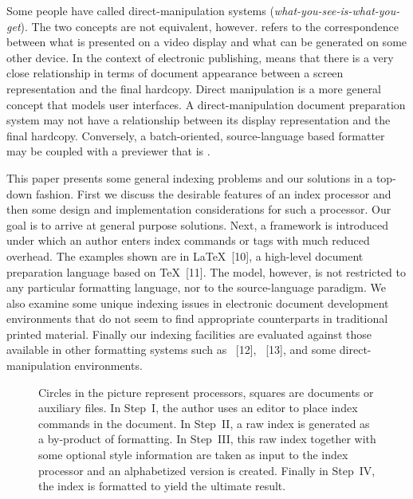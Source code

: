 Some people have called direct-manipulation systems {\W}
({\it what-you-see-is-what-you-get\/}).
The two concepts are not equivalent, however.
{\W} refers to the correspondence between what is presented on a video display
and what can be generated on some other device.  In the context of
electronic publishing, {\W} means that there is a very close relationship
in terms of document appearance
between a screen representation and the final hardcopy.
Direct manipulation is a more general concept that models user interfaces.
A direct-manipulation document preparation system may not have
a {\W} relationship between its display representation and the final hardcopy.
Conversely, a batch-oriented, source-language based formatter 
may be coupled with a previewer that is {\W}.

This paper presents some general indexing problems and our solutions 
in a top-down fashion.
First we discuss the desirable features of an index processor
and then some design and implementation considerations for such a processor.
Our goal is to arrive at general purpose solutions.
Next, a framework is introduced under which an author enters index commands
or tags with much reduced overhead.
The examples shown are in {\LaTeX}~[10], a high-level
document preparation language based on {\TeX}~[11].
The model, however, is not restricted to any particular formatting language,
nor to the source-language paradigm.
We also examine some unique indexing issues in
electronic document development environments that do not seem to find
appropriate counterparts in traditional printed material.
Finally our indexing facilities are evaluated against those available in
other formatting systems such as {\SB}~[12],
{\TF}~[13], and some direct-manipulation environments.

\begin{figure}[p]

\caption[{\it The sequential flow of index processing\/}.]{Circles
in the picture represent processors,
squares are documents or auxiliary files.  In Step~I, the author uses an
editor to place index commands in the document.  In Step~II, a raw index
is generated as a by-product of formatting.  In Step~III, this raw index
together with some optional style information are taken as input to
the index processor and an alphabetized version is created. 
Finally in Step~IV, the index is formatted to yield the ultimate result.}
\end{figure}

